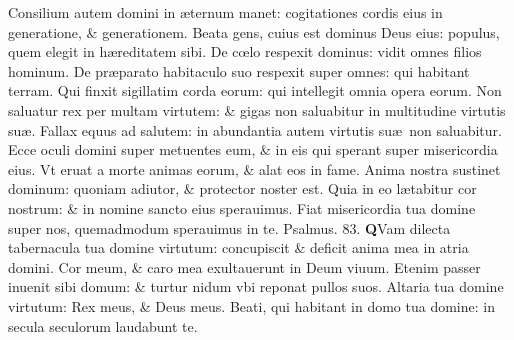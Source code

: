 \documentclass[a5paper,10pt]{book}
\def\ae{æ}
\def\oe{œ}
\begin{document}
\begin{multicols*}{2}
\newline \color{red} C\color{black}onsilium autem domini in \ae ternum manet: cogitationes cordis eius in generatione, \& generationem.
\newline \color{red} B\color{black}eata gens, cuius est dominus Deus eius: populus, quem elegit in h\ae reditatem sibi.
\newline \color{red} D\color{black}e c\oe lo respexit dominus: vidit omnes filios hominum.
\newline \color{red} D\color{black}e pr\ae parato habitaculo suo respexit super omnes: qui habitant terram.
\newline \color{red} Q\color{black}ui finxit sigillatim corda eorum: qui intellegit omnia opera eorum.
\newline \color{red} N\color{black}on saluatur rex per multam virtutem: \& gigas non saluabitur in multitudine virtutis su\ae .
\newline \color{red} F\color{black}allax equus ad salutem: in abundantia autem virtutis su\ae \ non saluabitur.
\newline \color{red} E\color{black}cce oculi domini super metuentes eum, \& in eis qui sperant super misericordia eius.
\newline \color{red} V\color{black}t eruat a morte animas eorum, \& alat eos in fame.
\newline \color{red} A\color{black}nima nostra sustinet dominum: quoniam adiutor, \& protector noster est.
\newline \color{red} Q\color{black}uia in eo l\ae tabitur cor nostrum: \& in nomine sancto eius sperauimus.
\newline \color{red} F\color{black}iat misericordia tua domine super nos, quemadmodum sperauimus in te.
\newline \color{red} Psalmus. \hypertarget{ps83}{83.} \color{black}
\vspace{-.5em}
\lettrine[lines=2]{\bfseries \color{red} Q}{}Vam dilecta tabernacula tua domine virtutum: concupiscit \& deficit anima mea in atria domini.
\newline \color{red} C\color{black}or meum, \& caro mea exultauerunt in Deum viuum.
\newline \color{red} E\color{black}tenim passer inuenit sibi domum: \& turtur nidum vbi reponat pullos suos.%
\newline \color{red} A\color{black}ltaria tua domine virtutum: Rex meus, \& Deus meus.
\newline \color{red} B\color{black}eati, qui habitant in domo tua domine: in secula seculorum laudabunt te.

\end{multicols*}
\end{document}
